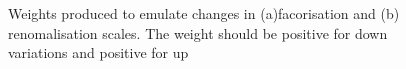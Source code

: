 \begin{figure}[h!]
  \centering

   \caption{Weights produced to emulate changes in (a)facorisation and (b) renomalisation scales. The weight should be positive for down variations and positive for up}
  \label{fig:weight}
\end{figure}

